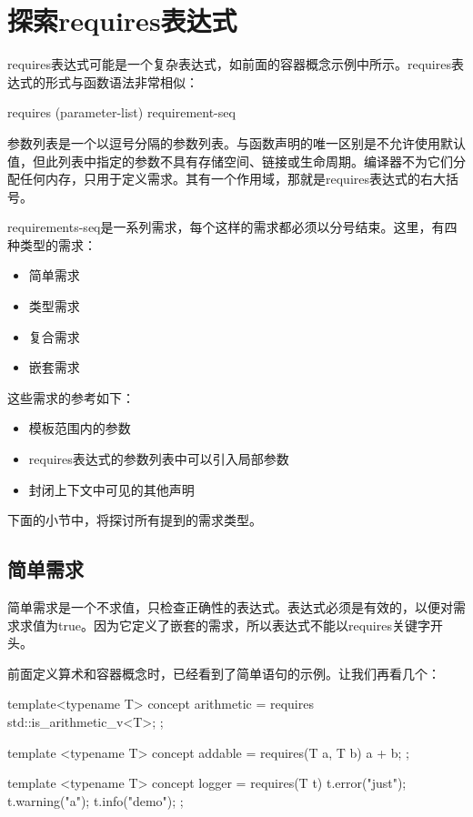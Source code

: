 \section{探索requires表达式}

requires表达式可能是一个复杂表达式，如前面的容器概念示例中所示。requires表达式的形式与函数语法非常相似：

\begin{cppcode}
requires (parameter-list) { requirement-seq }
\end{cppcode}

参数列表是一个以逗号分隔的参数列表。与函数声明的唯一区别是不允许使用默认值，但此列表中指定的参数不具有存储空间、链接或生命周期。编译器不为它们分配任何内存，只用于定义需求。其有一个作用域，那就是requires表达式的右大括号。

requirements-seq是一系列需求，每个这样的需求都必须以分号结束。这里，有四种类型的需求：

\begin{itemize}
  \item 简单需求
  \item 类型需求
  \item 复合需求
  \item 嵌套需求
\end{itemize}

这些需求的参考如下：

\begin{itemize}
  \item 模板范围内的参数
  \item requires表达式的参数列表中可以引入局部参数
  \item 封闭上下文中可见的其他声明
\end{itemize}

下面的小节中，将探讨所有提到的需求类型。

\subsection{简单需求}

简单需求是一个不求值，只检查正确性的表达式。表达式必须是有效的，以便对需求求值为true。因为它定义了嵌套的需求，所以表达式不能以requires关键字开头。

前面定义算术和容器概念时，已经看到了简单语句的示例。让我们再看几个：

\begin{cppcode}
template<typename T>
concept arithmetic = requires
{
	std::is_arithmetic_v<T>;
};

template <typename T>
concept addable = requires(T a, T b)
{
	a + b;
};

template <typename T>
concept logger = requires(T t)
{
	t.error("just");
	t.warning("a");
	t.info("demo");
};
\end{cppcode}

